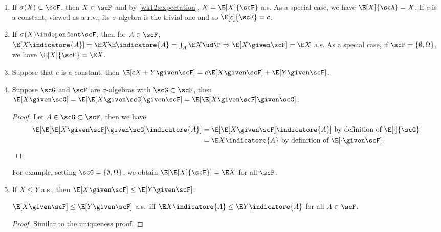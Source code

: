 \documentclass[../aipt.tex]{subfiles}
\begin{document}
\begin{enumerate}[1.]
\item If $\sigma(X)\subset \scF$, then $X \in \scF$ and by \cref{wk12:expectation}, $X=\E[X]{\scF}$ a.s. As a special case, we have $\E[X]{\scA}=X$. If $c$ is a constant, viewed as a r.v., its $\sigma$-algebra is the trivial one and so $\E[c]{\scF}=c$.

\item If $\sigma(X)\independent \scF$, then for $A\in \scF$, $\E[X\indicatore{A}]=\E X\E\indicatore{A}=\int_A \E X\ud \P \Rightarrow \E [X \given \scF] = \E X$ a.s. As a special case, if $\scF=\{\emptyset,\Omega \}$, we have $\E[X]{\scF}=\E X$.

\item Suppose that $c$ is a constant, then $\E [cX+Y \given \scF]=c\E[X \given \scF] + \E[Y \given \scF]$. 
\item Suppose $\scG$ and $\scF$ are $\sigma$-algebras with $\scG\subset\scF$, then $\E[X \given \scG]=\E[{\E[X \given \scG]} \given \scF]=\E[{\E[X \given \scF]} \given \scG]$.
\begin{proof}
Let $A\in\scG\subset\scF$, then we have
\begin{align*}
\E[{\E[{\E[X \given \scF]} \given \scG]}\indicatore{A}]
&= \E[{\E[X \given \scF]}\indicatore{A}] \text{ by definition of $\E[\cdot]{\scG}$}\\
&= \E X\indicatore{A} \text{ by definition of $\E[{\cdot} \given \scF]$}.
\end{align*}
\end{proof}
For example, setting $\scG=\{\emptyset,\Omega\}$, we obtain $\E[\E[X]{\scF}] = \E X$ for all $\scF$. 

\item If $X\leq Y$ a.s., then $\E[X \given \scF]\leq \E [Y \given \scF]$.
\begin{Lemma}\label{wk12:conditional_rel}
$\E[X \given \scF]\leq \E [Y \given \scF]$ a.s.\ iff $\E X\indicatore{A} \leq \E Y\indicatore{A}$ for all $A\in\scF$.
\end{Lemma}
\begin{proof}
Similar to the uniqueness proof.
\end{proof}


\end{enumerate}
\end{document}
